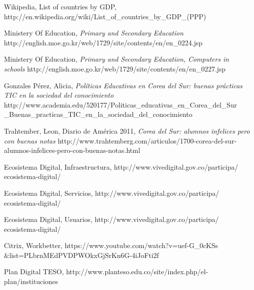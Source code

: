 \documentclass[conference]{IEEEtran}
\begin{document}


\begin{thebibliography}{1}
  
Wikipedia, List of countries by GDP,
http://en.wikipedia.org/wiki/List\_of\_countries\_by\_GDP\_(PPP)  

Ministery Of Education, \emph{Primary and Secondary Education}
http://english.moe.go.kr/web/1729/site/contents/en/en\_0224.jsp

Ministery Of Education, \emph{Primary and Secondary Education, Computers in schools}
http://english.moe.go.kr/web/1729/site/contents/en/en\_0227.jsp

Gonzales Pérez, Alicia, \emph{Políticas Educativas en Corea del Sur: buenas prácticas TIC en la sociedad del conocimiento} 
http://www.academia.edu/520177/Politicas\_educativas\_en\_Corea\_del\_Sur
\_Buenas\_practicas\_TIC\_en\_la\_sociedad\_del\_conocimiento

Trahtember, Leon, Diario de América 2011, \emph{Corea del Sur: alumnos infelices pero con buenas notas}
http://www.trahtemberg.com/articulos/1700-corea-del-sur-alumnos-infelices-pero-con-buenas-notas.html

Ecosistema Digital, Infraestructura,
http://www.vivedigital.gov.co/participa/
ecosistema-digital/

Ecosistema Digital, Servicios,
http://www.vivedigital.gov.co/participa/
ecosistema-digital/

Ecosistema Digital, Usuarios,
http://www.vivedigital.gov.co/participa/
ecosistema-digital/

Citrix, Workbetter,
https://www.youtube.com/watch?v=uef-G\_0cKSs
\&list=PLbrnMEdPVDPWOkxGjSrKn6G-4iJoFti2f

Plan Digital TESO,
http://www.planteso.edu.co/site/index.php/el-plan/instituciones


\end{thebibliography}




\end{document}

